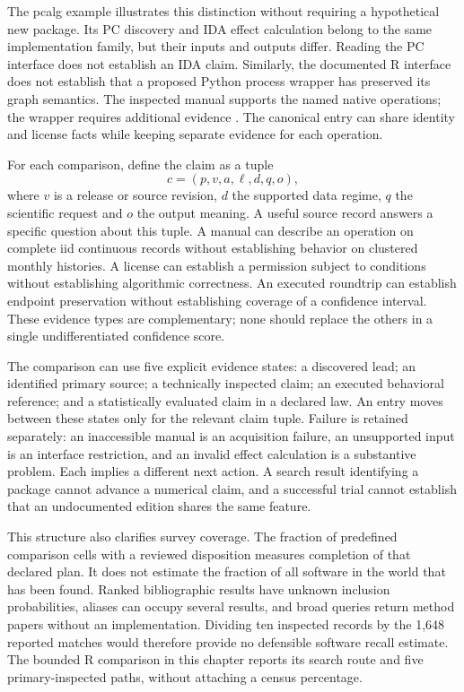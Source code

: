 The pcalg example illustrates this distinction without requiring a hypothetical
new package. Its PC discovery and IDA effect calculation belong to the same
implementation family, but their inputs and outputs differ. Reading the PC
interface does not establish an IDA claim. Similarly, the documented R
interface does not establish that a proposed Python process wrapper has
preserved its graph semantics. The inspected manual supports the named native
operations; the wrapper requires additional evidence
\citep{exec13_pcalg}. The canonical entry can share identity and license facts
while keeping separate evidence for each operation.

For each comparison, define the claim as a tuple
\[
 c=(p,v,a,\ell,d,q,o),
\]
where $v$ is a release or source revision, $d$ the supported data regime,
$q$ the scientific request and $o$ the output meaning. A useful source record
answers a specific question about this tuple. A manual can describe an
operation on complete iid continuous records without establishing behavior
on clustered monthly histories. A license can establish a permission subject
to conditions without establishing algorithmic correctness. An executed
roundtrip can establish endpoint preservation without establishing coverage
of a confidence interval. These evidence types are complementary; none
should replace the others in a single undifferentiated confidence score.

The comparison can use five explicit evidence states: a discovered lead;
an identified primary source; a technically inspected claim; an executed
behavioral reference; and a statistically evaluated claim in a declared law.
An entry moves between these states only for the relevant claim tuple.
Failure is retained separately: an inaccessible manual is an acquisition
failure, an unsupported input is an interface restriction, and an invalid
effect calculation is a substantive problem. Each implies a different next
action. A search result identifying a package cannot advance a numerical
claim, and a successful trial cannot establish that an undocumented edition
shares the same feature.

This structure also clarifies survey coverage. The fraction of predefined
comparison cells with a reviewed disposition measures completion of that
declared plan. It does not estimate the fraction of all software in the world
that has been found. Ranked bibliographic results have unknown inclusion
probabilities, aliases can occupy several results, and broad queries return
method papers without an implementation. Dividing ten inspected records by
the 1,648 reported matches would therefore provide no defensible software
recall estimate. The bounded R comparison in this chapter reports its search
route and five primary-inspected paths, without attaching a census percentage.

